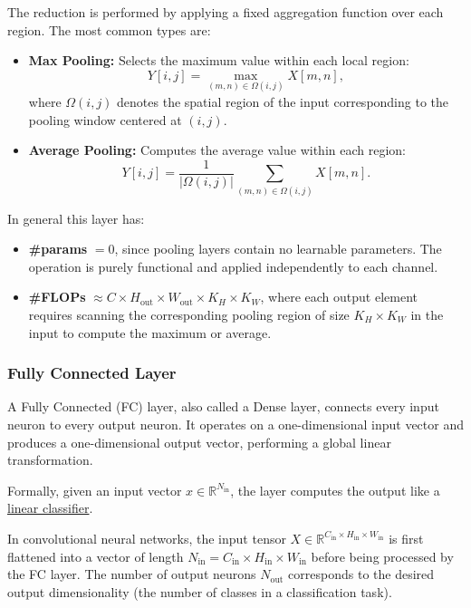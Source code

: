 The reduction is performed by applying a fixed aggregation function over each region. The most common types are:

\begin{itemize}
    \item \textbf{Max Pooling:}  
    Selects the maximum value within each local region:
    \[
    Y[i, j] = \max_{(m, n) \in \Omega(i,j)} X[m, n],
    \]
    where $\Omega(i,j)$ denotes the spatial region of the input corresponding to the pooling window centered at $(i,j)$.

    \item \textbf{Average Pooling:}  
    Computes the average value within each region:
    \[
    Y[i, j] = \frac{1}{|\Omega(i,j)|} \sum_{(m, n) \in \Omega(i,j)} X[m, n].
    \]
\end{itemize}


In general this layer has:
\begin{itemize}
    \item \textbf{\#params} $= 0$,  
    since pooling layers contain no learnable parameters. The operation is purely functional and applied independently to each channel.

    \item \textbf{\#FLOPs} $\approx C \times H_\text{out} \times W_\text{out} \times K_H \times K_W$,  
    where each output element requires scanning the corresponding pooling region of size $K_H \times K_W$ in the input to compute the maximum or average.
\end{itemize}

\subsubsection{Fully Connected Layer}

A Fully Connected (FC) layer, also called a Dense layer, connects every input neuron to every output neuron.  
It operates on a one-dimensional input vector and produces a one-dimensional output vector, performing a global linear transformation.

Formally, given an input vector $x \in \mathbb{R}^{N_\text{in}}$, the layer computes the output like a \href{}{linear classifier}.

In convolutional neural networks, the input tensor $X \in \mathbb{R}^{C_\text{in} \times H_\text{in} \times W_\text{in}}$ is first flattened into a vector of length
$N_\text{in} = C_\text{in} \times H_\text{in} \times W_\text{in}$
before being processed by the FC layer.  
The number of output neurons $N_\text{out}$ corresponds to the desired output dimensionality (the number of classes in a classification task).

